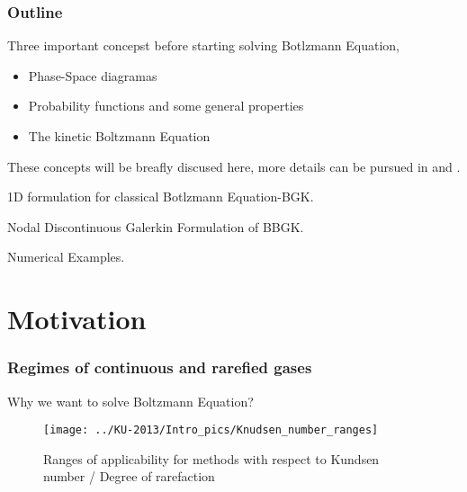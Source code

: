 \begin{frame} \frametitle{Outline}
  \begin{orangeitemize}
  \item Three important concepst before starting solving Botlzmann Equation, 
  \begin{itemize}
   \item Phase-Space diagramas
   \item Probability functions and some general properties
   \item The kinetic Boltzmann Equation
  \end{itemize}
  These concepts will be breafly discused here, more details can be pursued in \cite{morin2008introduction,flury1997first} and \cite{kremer2010introduction}.
  \item 1D formulation for classical Botlzmann Equation-BGK.
  \item Nodal Discontinuous Galerkin Formulation of BBGK.
  \item Numerical Examples.
  \end{orangeitemize}
\end{frame}

\section{Motivation}

\begin{frame} \frametitle{Regimes of continuous and rarefied gases}
  Why we want to solve Boltzmann Equation?
  \begin{figure}
  \centering
  \texttt{[image: ../KU-2013/Intro\_pics/Knudsen\_number\_ranges]}
  \caption{Ranges of applicability for methods with respect to Kundsen number / Degree of rarefaction}
  \label{fig:Knudsen_number_ranges}
  \end{figure}
\end{frame}

